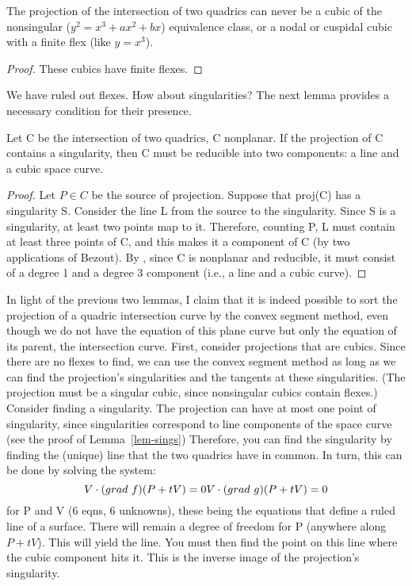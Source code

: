 \begin{corollary}
The projection of the intersection of two quadrics can never be a cubic
of the nonsingular ($y^{2}=x^{3}+ax^{2}+bx$) equivalence class, or a
nodal or cuspidal cubic with a finite flex (like $y=x^3$).
\end{corollary}
\begin{proof}
These cubics have finite flexes.
\end{proof}
We have ruled out flexes.  How about singularities?  The next lemma
provides a necessary condition for their presence.
\begin{lemma}
\label{lem-sings}
Let C be the intersection of two quadrics, C nonplanar.
If the projection of C contains a singularity, then C must be reducible
into two components: a line and a cubic space curve.
\end{lemma}
\begin{proof}
Let $P\in C$ be the source of projection.
Suppose that proj(C) has a singularity S.
Consider the line L from the source to the singularity.
Since S is a singularity, at least two points map to it.
Therefore, counting P, L must contain at least three points of C,
and this makes it a component of C (by two applications of Bezout).
By \cite{CS655}, since C is nonplanar and reducible, it must consist
of a degree 1 and a degree 3 component (i.e., a line and a cubic curve).
\end{proof}
In light of the previous two lemmas, I claim that it is indeed
possible to sort the projection of a quadric intersection curve by the
convex segment method, even though we do not have the equation of this
plane curve but only the equation of its parent, the intersection curve.
First, consider projections that are cubics.
Since there are no flexes to find, we can use the convex segment method
as long as we can find the projection's singularities and the
tangents at these singularities.  
(The projection must be a singular cubic, since nonsingular 
cubics contain flexes.)
Consider finding a singularity.
The projection can have at most one point of singularity, since 
singularities correspond to line components of the space curve (see 
the proof of Lemma~\ref{lem-sings})
Therefore, you can find the singularity by finding the (unique) line 
that the two quadrics have in common.  
In turn, this can be done by solving the system:
\[ V \cdot (grad\ f)(P+tV) = 0 \\
   V \cdot (grad\ g)(P+tV) = 0 \]
for P and V (6 eqns, 6 unknowns), these being the equations that
define a ruled line of a surface.
There will remain a degree of freedom for P (anywhere along $P+tV$).
This will yield the line.  You must then find the point on this line
where the cubic component hits it.
This is the inverse image of the projection's singularity.

